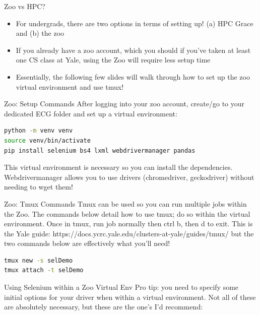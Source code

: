 \documentclass[10pt,xcolor={svgnames}]{beamer}
\begin{document}
\begin{frame}{Zoo vs HPC?}
\begin{itemize}
\item For undergrads, there are two options in terms of setting up! (a) HPC Grace and (b) the zoo
\item If you already have a zoo account, which you should if you've taken at least one CS class at Yale, using the Zoo will require less setup time
\item Essentially, the following few slides will walk through how to set up the zoo virtual environment and use tmux!
\end{itemize}
\end{frame}

\begin{frame}[fragile]{Zoo: Setup Commands}
After logging into your zoo account, create/go to your dedicated ECG folder and set up a virtual environment: \newline
  
\begin{lstlisting}[language=bash,style=bash]
python -m venv venv 
source venv/bin/activate
pip install selenium bs4 lxml webdrivermanager pandas
\end{lstlisting}

This virtual environment is necessary so you can install the dependencies. Webdrivermanager allows you to use drivers (chromedriver, geckodriver) without needing to wget them! 
\end{frame}

\begin{frame}[fragile]{Zoo: Tmux Commands}
Tmux can be used so you can run multiple jobs within the Zoo. \newline
The commands below detail how to use tmux; do so within the virtual environment. Once in tmux, run job normally then ctrl b, then d to exit. This is the Yale guide: https://docs.ycrc.yale.edu/clusters-at-yale/guides/tmux/ but the two commands below are effectively what you'll need!\newline

\begin{lstlisting}[language=bash,style=bash]
tmux new -s selDemo 
tmux attach -t selDemo

\end{lstlisting}

\end{frame}

\begin{frame}[fragile]{Using Selenium within a Zoo Virtual Env}
Pro tip: you need to specify some initial options for your driver when within a virtual environment. Not all of these are absolutely necessary, but these are the one's I'd recommend:  \newline
\end{frame}
\end{document}
